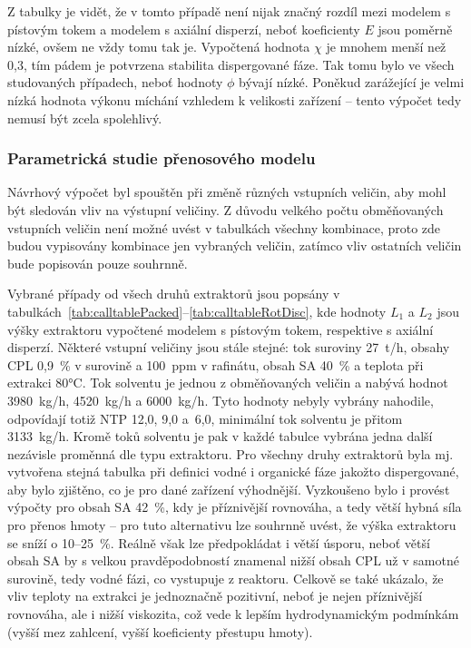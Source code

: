 Z tabulky je vidět, že v tomto případě není nijak značný rozdíl mezi modelem s pístovým tokem a modelem s axiální disperzí, neboť koeficienty $E$ jsou poměrně nízké, ovšem ne vždy tomu tak je.
Vypočtená hodnota $\chi$ je mnohem menší než 0,3, tím pádem je potvrzena stabilita dispergované fáze.
Tak tomu bylo ve všech studovaných případech, neboť hodnoty $\phi$ bývají nízké.
Poněkud zarážející je velmi nízká hodnota výkonu míchání vzhledem k velikosti zařízení -- tento výpočet tedy nemusí být zcela spolehlivý.

\subsubsection{Parametrická studie přenosového modelu} \label{restables}
Návrhový výpočet byl spouštěn při změně různých vstupních veličin, aby mohl být sledován vliv na výstupní veličiny.
Z důvodu velkého počtu obměňovaných vstupních veličin není možné uvést v tabulkách všechny kombinace, proto zde budou vypisovány kombinace jen vybraných veličin, zatímco vliv ostatních veličin bude popisován pouze souhrnně.

Vybrané případy od všech druhů extraktorů jsou popsány v tabulkách~\ref{tab:calltablePacked}--\ref{tab:calltableRotDisc}, kde hodnoty $L_1$ a $L_2$ jsou výšky extraktoru vypočtené modelem s pístovým tokem, respektive s axiální disperzí.
Některé vstupní veličiny jsou stále stejné: tok suroviny 27~t/h, obsahy CPL 0,9~\% v surovině a 100~ppm v rafinátu, obsah SA 40~\% a teplota při extrakci 80°C.
Tok solventu je jednou z obměňovaných veličin a nabývá hodnot 3980~kg/h, 4520~kg/h a 6000~kg/h.
Tyto hodnoty nebyly vybrány nahodile, odpovídají totiž NTP 12,0, 9,0 a~6,0, minimální tok solventu je přitom 3133~kg/h.
Kromě toků solventu je pak v každé tabulce vybrána jedna další nezávisle proměnná dle typu extraktoru.
Pro všechny druhy extraktorů byla mj. vytvořena stejná tabulka při definici vodné i organické fáze jakožto dispergované, aby bylo zjištěno, co je pro dané zařízení výhodnější.
Vyzkoušeno bylo i provést výpočty pro obsah SA 42~\%, kdy je příznivější rovnováha, a tedy větší hybná síla pro přenos hmoty -- pro tuto alternativu lze souhrnně uvést, že výška extraktoru se sníží o 10--25~\%.
Reálně však lze předpokládat i větší úsporu, neboť větší obsah SA by s velkou pravděpodobností znamenal nižší obsah CPL už v samotné surovině, tedy vodné fázi, co vystupuje z reaktoru.
Celkově se také ukázalo, že vliv teploty na extrakci je jednoznačně pozitivní, neboť je nejen příznivější rovnováha, ale i nižší viskozita, což vede k lepším hydrodynamickým podmínkám (vyšší mez zahlcení, vyšší koeficienty přestupu hmoty).

